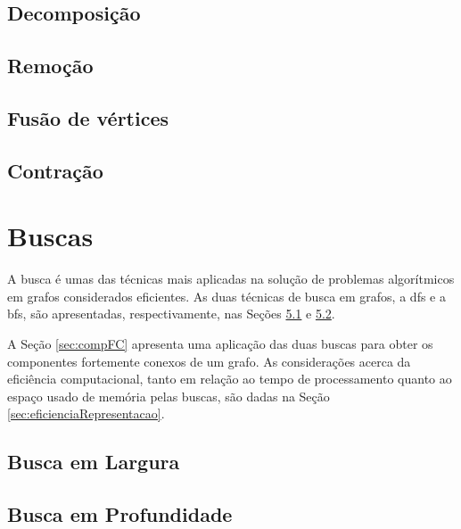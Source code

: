 \documentclass[
12pt,
a4paper,
semrecuonosumario,
sumario = abnt-6027-2012]{report}
\begin{document}
	
	\section{Decomposição}\label{sec:decomposicao}
	
	\section{Remoção}\label{sec:remocao}
	
	
	\section{Fusão de vértices}\label{sec:fusao}
	
	\section{Contração}\label{sec:contracao}
	
	
	\chapter{Buscas}\label{cap:buscas}
	
	A busca é umas das técnicas mais aplicadas na solução de problemas algorítmicos em grafos considerados eficientes. As duas técnicas de busca em grafos, a {dfs} e a {bfs}, são apresentadas, respectivamente, nas Seções \ref{sec:buscaLarg} e \ref{sec:buscaProf}.
	
	A Seção \ref{sec:compFC} apresenta uma aplicação das duas buscas para obter os componentes fortemente conexos de um grafo. As considerações acerca da eficiência computacional, tanto em relação ao tempo de processamento quanto ao espaço usado de memória pelas buscas, são dadas na Seção \ref{sec:eficienciaRepresentacao}.
	
	\section{Busca em Largura}\label{sec:buscaLarg}
	
	\section{Busca em Profundidade}\label{sec:buscaProf}
	
\end{document}
